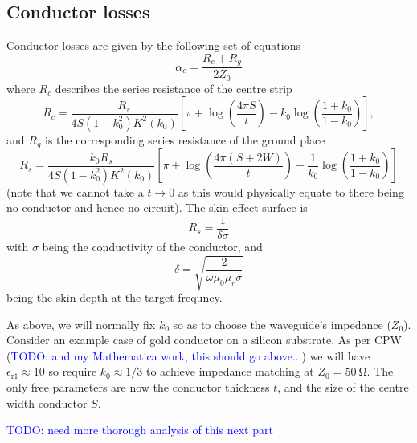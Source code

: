 \documentclass[a4paper]{article}
\newcommand{\cm}[1]{\textcolor{blue}{#1}} %
\begin{document}
\subsection{Conductor losses}

Conductor losses are given by the following set of equations\cite{Simons2004}
\begin{equation}
  \alpha_c = \frac{R_c +R_g}{2Z_0}
\end{equation}
where $R_c$ describes the series resistance of the centre strip
\begin{equation}
  R_c = \frac{R_s}{4 S(1-k_0^2)K^2(k_0)}\left[ \pi + \log\left(\frac{4\pi
  S}{t}\right) - k_0\log\left(\frac{1+k_0}{1-k_0}\right) \right],
\end{equation}
and $R_g$ is the corresponding series resistance of the ground place
\begin{equation}
  R_s = \frac{k_0 R_s}{4S(1-k_0^2)K^2(k_0)}\left[\pi +
  \log\left(\frac{4\pi(S+2W)}{t}\right) -
  \frac{1}{k_0}\log\left(\frac{1+k_0}{1-k_0}\right)\right]
\end{equation}
(note that we cannot take a $t\to 0$ as this would physically equate to there
being no conductor and hence no circuit). The skin effect surface is
\begin{equation}
  R_s = \frac{1}{\delta\sigma}
\end{equation}
with $\sigma$ being the conductivity of the conductor, and
\begin{equation}
  \delta = \sqrt{\frac{2}{\omega\mu_0\mu_r\sigma}}
\end{equation}
being the skin depth at the target frequncy.



As above, we will normally fix $k_0$ so as to choose the waveguide's impedance
($Z_0$). Consider an example case of gold conductor on a silicon substrate. As
per CPW\cite{1127105} (\cm{TODO: and my Mathematica work, this should go
above...}) we will have $\epsilon_\mathrm{r1} \approx 10$ so require $k_0
\approx 1/3$ to achieve impedance matching at $Z_0 = \SI{50}{\ohm}$. The only
free parameters are now the conductor thickness $t$, and the size of the centre
width conductor $S$.

\cm{TODO: need more thorough analysis of this next part}
\end{document}
